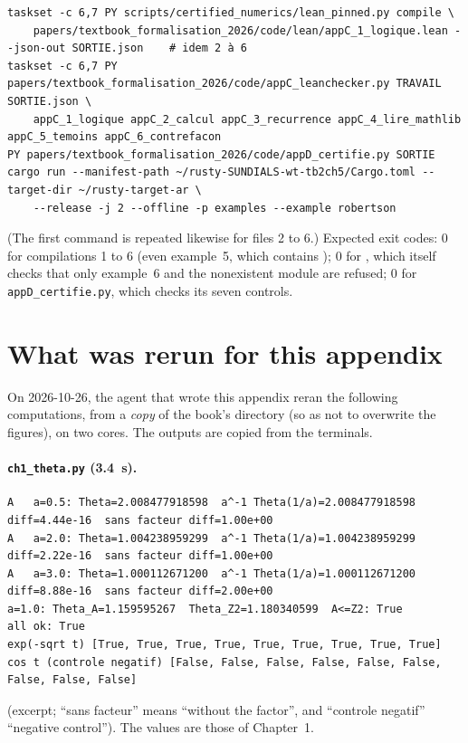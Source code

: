 \begin{lstlisting}[style=appC,language={}]
taskset -c 6,7 PY scripts/certified_numerics/lean_pinned.py compile \
    papers/textbook_formalisation_2026/code/lean/appC_1_logique.lean --json-out SORTIE.json    # idem 2 à 6
taskset -c 6,7 PY papers/textbook_formalisation_2026/code/appC_leanchecker.py TRAVAIL SORTIE.json \
    appC_1_logique appC_2_calcul appC_3_recurrence appC_4_lire_mathlib appC_5_temoins appC_6_contrefacon
PY papers/textbook_formalisation_2026/code/appD_certifie.py SORTIE
cargo run --manifest-path ~/rusty-SUNDIALS-wt-tb2ch5/Cargo.toml --target-dir ~/rusty-target-ar \
    --release -j 2 --offline -p examples --example robertson
\end{lstlisting}
(The first command is repeated likewise for files 2 to 6.) Expected exit codes: $0$ for compilations 1 to 6 (even
example~5, which contains \lean{sorry}); $0$ for , which itself checks that only example~6
and the nonexistent module are refused; $0$ for \texttt{appD\_certifie.py}, which checks its seven controls.

\section{What was rerun for this appendix}\label{appE:sec:relances}

On 2026-10-26, the agent that wrote this appendix reran the following computations, from a \emph{copy} of the book's
directory (so as not to overwrite the figures), on two cores. The outputs are copied from the terminals.

\paragraph{\texttt{ch1\_theta.py} (3.4~s).}
\begin{lstlisting}[style=appC,language={}]
A   a=0.5: Theta=2.008477918598  a^-1 Theta(1/a)=2.008477918598  diff=4.44e-16  sans facteur diff=1.00e+00
A   a=2.0: Theta=1.004238959299  a^-1 Theta(1/a)=1.004238959299  diff=2.22e-16  sans facteur diff=1.00e+00
A   a=3.0: Theta=1.000112671200  a^-1 Theta(1/a)=1.000112671200  diff=8.88e-16  sans facteur diff=2.00e+00
a=1.0: Theta_A=1.159595267  Theta_Z2=1.180340599  A<=Z2: True
all ok: True
exp(-sqrt t) [True, True, True, True, True, True, True, True, True]
cos t (controle negatif) [False, False, False, False, False, False, False, False, False]
\end{lstlisting}
(excerpt; ``sans facteur'' means ``without the factor'', and ``controle negatif'' ``negative control''). The values are
those of Chapter~1.

